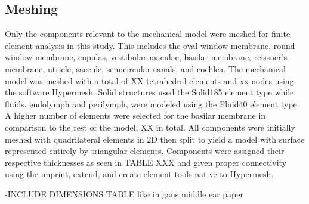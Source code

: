 \documentclass[12pt]{article}
\begin{document}
\subsection{Meshing}
Only the components relevant to the mechanical model were meshed for finite element analysis in this study. This includes the oval window membrane, round window membrane, cupulas, vestibular maculae, basilar membrane, reissner's membrane, utricle, saccule, semicircular canals, and cochlea. The mechanical model was meshed with a total of XX tetrahedral elements and xx nodes using the software Hypermesh. Solid structures used the Solid185 element type while fluids, endolymph and perilymph, were modeled using the Fluid40 element type. A higher number of elements were selected for the basilar membrane in comparison to the rest of the model, XX in total. All components were initially meshed with quadrilateral elements in 2D then split to yield a model with surface represented entirely by triangular elements. Components were assigned their respective thicknesses as seen in TABLE XXX and given proper connectivity using the imprint, extend, and create element tools native to Hypermesh. 

-INCLUDE DIMENSIONS TABLE like in gans middle ear paper
\end{document}
